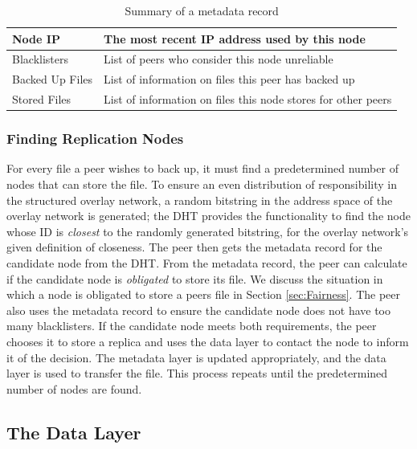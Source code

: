 \documentclass[12pt]{report}
\begin{document}
\begin{table}
\begin{center}
    \begin{tabular}{| l | l |}
    \hline
    Node IP & The most recent IP address used by this node\\ \hline
    Blacklisters & List of peers who consider this node unreliable\\ \hline
    Backed Up Files & List of information on files this peer has backed up \\ \hline
    Stored Files & List of information on files this node stores for other peers \\ \hline
    \end{tabular}
    \caption{Summary of a metadata record}
    \label{tab:metadataRecord}
\end{center}
\end{table}

\subsubsection{Finding Replication Nodes} \label{subsubsec:FindingReplicationNodes}

For every file a peer wishes to back up, it must find a predetermined number of nodes that can store the file. To ensure an even distribution of responsibility in the structured overlay network, a random bitstring in the address space of the overlay network is generated; the DHT provides the functionality to find the node whose ID is \textit{closest} to the randomly generated bitstring, for the overlay network's given definition of closeness. The peer then gets the metadata record for the candidate node from the DHT. From the metadata record, the peer can calculate if the candidate node is \textit{obligated} to store its file. We discuss the situation in which a node is obligated to store a peers file in Section \ref{sec:Fairness}. The peer also uses the metadata record to ensure the candidate node does not have too many blacklisters. If the candidate node meets both requirements, the peer chooses it to store a replica and uses the data layer to contact the node to inform it of the decision. The metadata layer is updated appropriately, and the data layer is used to transfer the file. This process repeats until the predetermined number of nodes are found.

\subsection{The Data Layer} \label{subsec:TheDataLayer}
\end{document}
